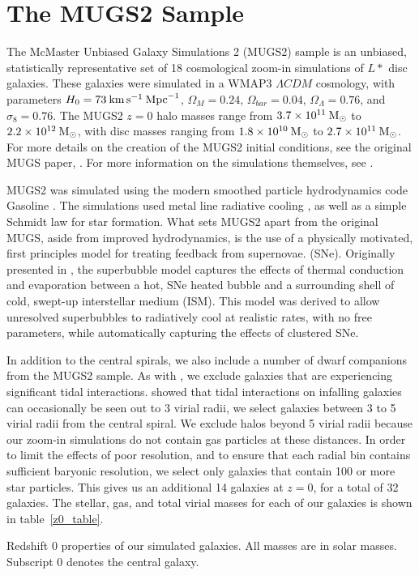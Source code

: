 \section{The MUGS2 Sample}
The McMaster Unbiased Galaxy Simulations 2 (MUGS2) sample is an unbiased,
statistically representative set of 18 cosmological zoom-in simulations of $L*$
disc galaxies.  These galaxies were simulated in a {\sc WMAP3} $\Lambda CDM$
cosmology, with parameters $H_0 = 73\>{\rm km}\,{\rm s}^{-1} \>{\rm Mpc}^{-1}$, $\Omega_M=0.24$,
$\Omega_{bar}=0.04$, $\Omega_\Lambda=0.76$, and $\sigma_8=0.76$.  The MUGS2
$z=0$ halo masses range from $3.7\times10^{11}\>{\rm M_{\odot}}$ to $2.2\times10^{12}\>{\rm M_{\odot}}$,
with disc masses ranging from $1.8\times10^{10}\>{\rm M_{\odot}}$ to
$2.7\times10^{11}\>{\rm M_{\odot}}$.  For more details on the creation of the MUGS2 initial
conditions, see the original MUGS paper, \citet{Stinson2010}.  For more
information on the simulations themselves, see \citet{Keller2015,Keller2016}.

MUGS2 was simulated using the modern smoothed particle hydrodynamics code {\sc
Gasoline} \citep{Wadsley2004,Keller2014}.  The simulations used metal line
radiative cooling \citep{Shen2010}, as well as a simple Schmidt law for star
formation.  What sets MUGS2 apart from the original MUGS, aside from improved
hydrodynamics, is the use of a physically motivated, first principles model for
treating feedback from supernovae. (SNe).  Originally presented in
\citet{Keller2014}, the superbubble model captures the effects of thermal
conduction and evaporation between a hot, SNe heated bubble and a surrounding
shell of cold, swept-up interstellar medium (ISM).  This model was derived to allow unresolved
superbubbles to radiatively cool at realistic rates, with no free parameters,
while automatically capturing the effects of clustered SNe.

In addition to the central spirals, we also include a number of dwarf companions
from the MUGS2 sample.  As with \citet{McGaugh2016}, we exclude galaxies that
are experiencing significant tidal interactions.  \citet{Joshi2016} showed that
tidal interactions on infalling galaxies can occasionally be seen out to 3
virial radii, we select galaxies between 3 to 5 virial radii from the central
spiral. We exclude halos beyond 5 virial radii because our zoom-in simulations
do not contain gas particles at these distances. In order to limit the effects
of poor resolution, and to ensure that each radial bin contains sufficient
baryonic resolution, we select only galaxies that contain 100 or more star
particles.  This gives us an additional 14 galaxies at $z=0$, for a total of
32 galaxies.  The stellar, gas, and total virial masses for each of our galaxies
is shown in table~\ref{z0_table}.
\begin{table}

\caption{Redshift 0 properties of our simulated galaxies.  All masses are in
    solar masses. Subscript 0 denotes the central galaxy.}
\label{z0_table}
\end{table}


